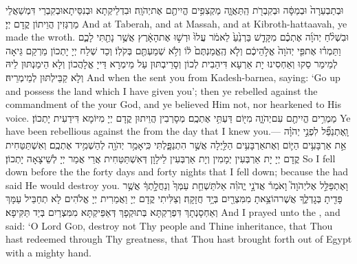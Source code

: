 {וּבְתַבְעֵרָה֙ וּבְמַסָּ֔ה וּבְקִבְרֹ֖ת הַֽתַּאֲוָ֑ה מַקְצִפִ֥ים הֱיִיתֶ֖ם אֶת\maqqaf יְהֹוָֽה׃}
{וּבִדְלֵיקְתָא וּבְנִסֵּיתָאוּבְקִבְרֵי דִּמְשַׁאֲלֵי מַרְגְּזִין הֲוֵיתוֹן קֳדָם יְיָ׃}
{And at Taberah, and at Massah, and at Kibroth-hattaavah, ye made the \lord\space wroth.}{}
{וּבִשְׁלֹ֨חַ יְהֹוָ֜ה אֶתְכֶ֗ם מִקָּדֵ֤שׁ בַּרְנֵ֙עַ֙ לֵאמֹ֔ר עֲלוּ֙ וּרְשׁ֣וּ אֶת\maqqaf הָאָ֔רֶץ אֲשֶׁ֥ר נָתַ֖תִּי לָכֶ֑ם וַתַּמְר֗וּ אֶת\maqqaf פִּ֤י יְהֹוָה֙ אֱלֹ֣הֵיכֶ֔ם וְלֹ֤א הֶֽאֱמַנְתֶּם֙ ל֔וֹ וְלֹ֥א שְׁמַעְתֶּ֖ם בְּקֹלֽוֹ׃}
{וְכַד שְׁלַח יְיָ יָתְכוֹן מֵרְקַם גֵּיאָה לְמֵימַר סַקוּ וְאַחְסִינוּ יָת אַרְעָא דִּיהַבִית לְכוֹן וְסָרֵיבְתּוּן עַל מֵימְרָא דַּייָ אֱלָהֲכוֹן וְלָא הֵימַנְתּוּן לֵיהּ וְלָא קַבֵּילְתּוּן לְמֵימְרֵיהּ׃}
{And when the \lord\space sent you from Kadesh-barnea, saying: ‘Go up and possess the land which I have given you’; then ye rebelled against the commandment of the \lord\space your God, and ye believed Him not, nor hearkened to His voice.}{}
{מַמְרִ֥ים הֱיִיתֶ֖ם עִם\maqqaf יְהֹוָ֑ה מִיּ֖וֹם דַּעְתִּ֥י אֶתְכֶֽם׃}
{מְסָרְבִין הֲוֵיתוּן קֳדָם יְיָ מִיּוֹמָא דִּידַעִית יָתְכוֹן׃}
{Ye have been rebellious against the \lord\space from the day that I knew you.—}{}
{וָֽאֶתְנַפַּ֞ל לִפְנֵ֣י יְהֹוָ֗ה אֵ֣ת אַרְבָּעִ֥ים הַיּ֛וֹם וְאֶת\maqqaf אַרְבָּעִ֥ים הַלַּ֖יְלָה אֲשֶׁ֣ר הִתְנַפָּ֑לְתִּי כִּֽי\maqqaf אָמַ֥ר יְהֹוָ֖ה לְהַשְׁמִ֥יד אֶתְכֶֽם׃}
{וְאִשְׁתַּטַּחִית קֳדָם יְיָ יָת אַרְבְּעִין יְמָמִין וְיָת אַרְבְּעִין לֵילָוָן דְּאִשְׁתַּטַּחִית אֲרֵי אֲמַר יְיָ לְשֵׁיצָאָה יָתְכוֹן׃}
{So I fell down before the \lord\space the forty days and forty nights that I fell down; because the \lord\space had said He would destroy you.}{}
{וָאֶתְפַּלֵּ֣ל אֶל\maqqaf יְהֹוָה֮ וָאֹמַר֒ אֲדֹנָ֣י יֱהֹוִ֗ה אַל\maqqaf תַּשְׁחֵ֤ת עַמְּךָ֙ וְנַחֲלָ֣תְךָ֔ אֲשֶׁ֥ר פָּדִ֖יתָ בְּגׇדְלֶ֑ךָ אֲשֶׁר\maqqaf הוֹצֵ֥אתָ מִמִּצְרַ֖יִם בְּיָ֥ד חֲזָקָֽה׃}
{וְצַלִּיתִי קֳדָם יְיָ וַאֲמַרִית יְיָ אֱלֹהִים לָא תְחַבֵּיל עַמָּךְ וְאַחְסָנְתָךְ דִּפְרַקְתָּא בְּתוּקְפָךְ דְּאַפֵּיקְתָּא מִמִּצְרַיִם בְּיַד תַּקִּיפָא׃}
{And I prayed unto the \lord, and said: ‘O Lord \textsc{God}, destroy not Thy people and Thine inheritance, that Thou hast redeemed through Thy greatness, that Thou hast brought forth out of Egypt with a mighty hand.}{}

